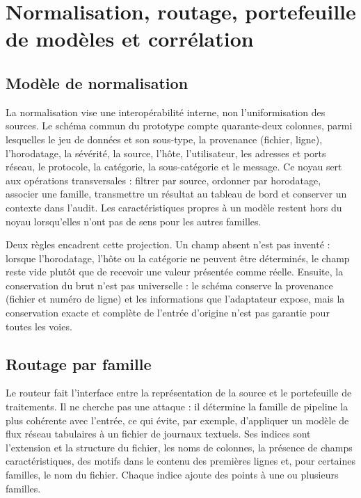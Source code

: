 \section{Normalisation, routage, portefeuille de modèles et corrélation}

\label{sec:normalisation-routage}

\subsection{Modèle de normalisation}

La normalisation vise une interopérabilité interne, non l'uniformisation des sources. Le schéma commun du prototype compte quarante-deux colonnes, parmi lesquelles le jeu de données et son sous-type, la provenance (fichier, ligne), l'horodatage, la sévérité, la source, l'hôte, l'utilisateur, les adresses et ports réseau, le protocole, la catégorie, la sous-catégorie et le message. Ce noyau sert aux opérations transversales : filtrer par source, ordonner par horodatage, associer une famille, transmettre un résultat au tableau de bord et conserver un contexte dans l'audit. Les caractéristiques propres à un modèle restent hors du noyau lorsqu'elles n'ont pas de sens pour les autres familles.

Deux règles encadrent cette projection. Un champ absent n'est pas inventé : lorsque l'horodatage, l'hôte ou la catégorie ne peuvent être déterminés, le champ reste vide plutôt que de recevoir une valeur présentée comme réelle. Ensuite, la conservation du brut n'est pas universelle : le schéma conserve la provenance (fichier et numéro de ligne) et les informations que l'adaptateur expose, mais la conservation exacte et complète de l'entrée d'origine n'est pas garantie pour toutes les voies.

\subsection{Routage par famille}

Le routeur fait l'interface entre la représentation de la source et le portefeuille de traitements. Il ne cherche pas une attaque : il détermine la famille de pipeline la plus cohérente avec l'entrée, ce qui évite, par exemple, d'appliquer un modèle de flux réseau tabulaires à un fichier de journaux textuels. Ses indices sont l'extension et la structure du fichier, les noms de colonnes, la présence de champs caractéristiques, des motifs dans le contenu des premières lignes et, pour certaines familles, le nom du fichier. Chaque indice ajoute des points à une ou plusieurs familles.

